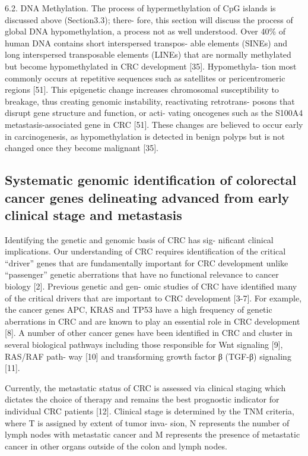 6.2. DNA Methylation. The process of hypermethylation of CpG islands is
  discussed above (Section3.3); there- fore, this section will discuss the process
  of global DNA hypomethylation, a process not as well understood. Over 40\% of
  human DNA contains short interspersed transpos- able elements (SINEs) and long
  interspersed transposable elements (LINEs) that are normally methylated but
  become hypomethylated in CRC development [35]. Hypomethyla- tion most commonly
  occurs at repetitive sequences such as satellites or pericentromeric regions
  [51]. This epigenetic change increases chromosomal susceptibility to breakage,
  thus creating genomic instability, reactivating retrotrans- posons that disrupt
  gene structure and function, or acti- vating oncogenes such as the S100A4
  metastasis-associated gene in CRC [51]. These changes are believed to occur
  early in carcinogenesis, as hypomethylation is detected in benign polyps but is
  not changed once they become malignant [35].

\subsection{Systematic genomic identification of colorectal cancer genes delineating advanced from early clinical stage and metastasis}

  Identifying the genetic and genomic basis of CRC has sig- nificant clinical
  implications. Our understanding of CRC requires identification of the critical
  “driver” genes that are fundamentally important for CRC development unlike
  “passenger” genetic aberrations that have no functional relevance to cancer
  biology [2]. Previous genetic and gen- omic studies of CRC have identified
  many of the critical drivers that are important to CRC development [3-7]. For
  example, the cancer genes APC, KRAS and TP53 have a high frequency of genetic
  aberrations in CRC and are known to play an essential role in CRC development
  [8]. A number of other cancer genes have been identified in CRC and cluster in
  several biological pathways including those responsible for Wnt signaling [9],
  RAS/RAF path- way [10] and transforming growth factor β (TGF-β) signaling
  [11].

  Currently, the metastatic status of CRC is assessed via clinical staging which
  dictates the choice of therapy and remains the best prognostic indicator for
  individual CRC patients [12]. Clinical stage is determined by the TNM
  criteria, where T is assigned by extent of tumor inva- sion, N represents the
  number of lymph nodes with metastatic cancer and M represents the presence of
  metastatic cancer in other organs outside of the colon and lymph nodes.

